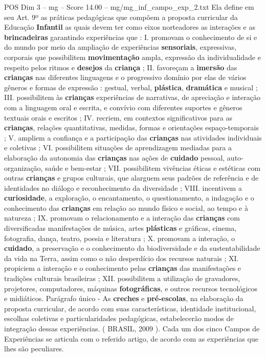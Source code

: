 \begin{textsample}{POS Dim 3 – mg – Score 14.00 – mg/mg\_inf\_campo\_exp\_2.txt}
Ela define em seu Art. 9º as práticas pedagógicas que compõem a proposta curricular da Educação \textbf{Infantil} as quais devem ter como eixos norteadores as interações e as \textbf{brincadeiras} garantindo experiências que : I. promovam o conhecimento de si e do mundo por meio da ampliação de experiências \textbf{sensoriais}, expressivas, corporais que possibilitem \textbf{movimentação} ampla, expressão da individualidade e respeito pelos ritmos e \textbf{desejos} da \textbf{criança} ; II. favoreçam a \textbf{imersão} das \textbf{crianças} nas diferentes linguagens e o progressivo domínio por elas de vários gêneros e formas de expressão : gestual, verbal, \textbf{plástica}, \textbf{dramática} e musical ; III. possibilitem às \textbf{crianças} experiências de narrativas, de apreciação e interação com a linguagem oral e escrita, e convívio com diferentes suportes e gêneros textuais orais e escritos ; IV. recriem, em contextos significativos para as \textbf{crianças}, relações quantitativas, medidas, formas e orientações espaço-temporais ; V. ampliem a confiança e a participação das \textbf{crianças} nas atividades individuais e coletivas ; VI. possibilitem situações de aprendizagem mediadas para a elaboração da autonomia das \textbf{crianças} nas ações de \textbf{cuidado} pessoal, auto-organização, saúde e bem-estar ; VII. possibilitem vivências éticas e estéticas com outras \textbf{crianças} e grupos culturais, que alarguem seus padrões de referência e de identidades no diálogo e reconhecimento da diversidade ; VIII. incentivem a \textbf{curiosidade}, a exploração, o encantamento, o questionamento, a indagação e o conhecimento das \textbf{crianças} em relação ao mundo físico e social, ao tempo e à natureza ; IX. promovam o relacionamento e a interação das \textbf{crianças} com diversificadas manifestações de música, artes \textbf{plásticas} e gráficas, cinema, fotografia, dança, teatro, poesia e literatura ; X. promovam a interação, o \textbf{cuidado}, a preservação e o conhecimento da biodiversidade e da sustentabilidade da vida na Terra, assim como o não desperdício dos recursos naturais ; XI. propiciem a interação e o conhecimento pelas \textbf{crianças} das manifestações e tradições culturais brasileiras ; XII. possibilitem a utilização de gravadores, projetores, computadores, máquinas \textbf{fotográficas}, e outros recursos tecnológicos e midiáticos.
Parágrafo único - As \textbf{creches} e \textbf{pré-escolas}, na elaboração da proposta curricular, de acordo com suas características, identidade institucional, escolhas coletivas e particularidades pedagógicas, estabelecerão modos de integração dessas experiências. ( BRASIL, 2009 ).
Cada um dos cinco Campos de Experiências se articula com o referido artigo, de acordo com as experiências que lhes são peculiares.

\end{textsample}
